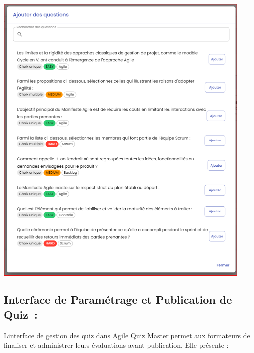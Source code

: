 \documentclass[12pt,a4paper,twoside,openright]{report}
\begin{document}
\includegraphics[width=4.88219in,height=5.70168in]{latex_media/media/image57.png}

\hypertarget{interface-de-paramuxe9trage-et-publication-de-quiz}{%
\subsection{Interface de Paramétrage et Publication de
Quiz~:}\label{interface-de-paramuxe9trage-et-publication-de-quiz}}

L\textquotesingle interface de gestion des quiz dans Agile Quiz Master
permet aux formateurs de finaliser et administrer leurs évaluations
avant publication. Elle présente :
\end{document}
